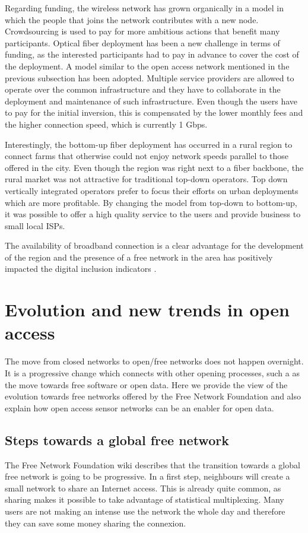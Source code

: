 \documentclass[journal]{IEEEtran}
\begin{document}
Regarding funding, the wireless network has grown organically in a model in which the people that joins the network contributes with a new node.
Crowdsourcing is used to pay for more ambitious actions that benefit many participants.
Optical fiber deployment has been a new challenge in terms of funding, as the interested participants had to pay in advance to cover the cost of the deployment.
A model similar to the open access network mentioned in the previous subsection has been adopted.
Multiple service providers are allowed to operate over the common infrastructure and they have to collaborate in the deployment and maintenance of such infrastructure.
Even though the users have to pay for the initial inversion, this is compensated by the lower monthly fees and the higher connection speed, which is currently 1 Gbps.

Interestingly,  the bottom-up fiber deployment has occurred in a rural region to connect farms that otherwise could not enjoy network speeds parallel to those offered in the city.
Even though the region was right next to a fiber backbone, the rural market was not attractive for traditional top-down operators.
Top down vertically integrated operators prefer to focus their efforts on urban deployments which are more profitable.
By changing the model from top-down to bottom-up, it was possible to offer a high quality service to the users and provide business to small local ISPs.

The availability of broadband connection is a clear advantage for the development of the region and the presence of a free network in the area has positively impacted the digital inclusion indicators \cite{oliver2010wca}.

\section{Evolution and new trends in open access}

The move from closed networks to open/free networks does not happen overnight.
It is a progressive change which connects with other opening processes, such a as the move towards free software or open data.
Here we provide the view of the evolution towards free networks offered by the Free Network Foundation and also explain how open access sensor networks can be an enabler for open data.


\subsection{Steps towards a global free network}
The Free Network Foundation wiki describes that the transition towards a global free network is going to be progressive.
In a first step, neighbours will create a small network to share an Internet access.
This is already quite common, as sharing makes it possible to take advantage of statistical multiplexing.
Many users are not making an intense use the network the whole day and therefore they can save some money sharing the connexion.
\end{document}

